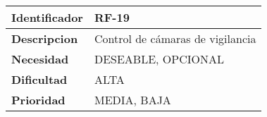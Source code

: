 \begin{center}
    \begin{tabular}{|p{2.6cm}|p{12cm}|}
    \hline
    \textbf{Identificador} & RF-19\\
    \hline
    \textbf{Descripcion} & Control de cámaras de vigilancia\\
    \hline
    \textbf{Necesidad} & DESEABLE, OPCIONAL\\
    \hline
    \textbf{Dificultad} & ALTA\\
    \hline
    \textbf{Prioridad} & MEDIA, BAJA\\
    \hline
    \end{tabular}
\end{center}
